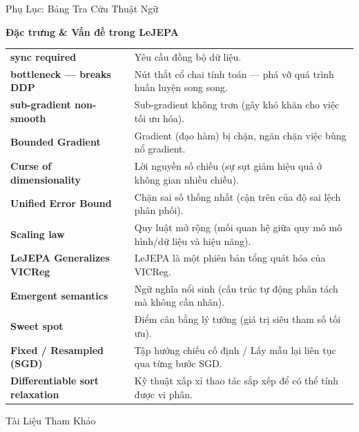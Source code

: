 \documentclass[aspectratio=169,9pt]{beamer}
\begin{document}
\begin{frame}[allowframebreaks]{Phụ Lục: Bảng Tra Cứu Thuật Ngữ}
  \begin{accentbox}
  \footnotesize \textbf{Đặc trưng \& Vấn đề trong LeJEPA}
  \end{accentbox}
  \vspace{0.5em}
  {\scriptsize
  \renewcommand{\arraystretch}{1.4}
  \begin{tabular}{@{} >{\bfseries\color{maccent!75!black}}l p{10.5cm} @{}}
    sync required & Yêu cầu đồng bộ dữ liệu. \\
    bottleneck — breaks DDP & Nút thắt cổ chai tính toán — phá vỡ quá trình huấn luyện song song. \\
    sub-gradient non-smooth & Sub-gradient không trơn (gây khó khăn cho việc tối ưu hóa). \\
    Bounded Gradient & Gradient (đạo hàm) bị chặn, ngăn chặn việc bùng nổ gradient. \\
    Curse of dimensionality & Lời nguyền số chiều (sự sụt giảm hiệu quả ở không gian nhiều chiều). \\
    Unified Error Bound & Chặn sai số thống nhất (cận trên của độ sai lệch phân phối). \\
    Scaling law & Quy luật mở rộng (mối quan hệ giữa quy mô mô hình/dữ liệu và hiệu năng). \\
    LeJEPA Generalizes VICReg & LeJEPA là một phiên bản tổng quát hóa của VICReg. \\
    Emergent semantics & Ngữ nghĩa nổi sinh (cấu trúc tự động phân tách mà không cần nhãn). \\
    Sweet spot & Điểm cân bằng lý tưởng (giá trị siêu tham số tối ưu). \\
    Fixed / Resampled (SGD) & Tập hướng chiếu cố định / Lấy mẫu lại liên tục qua từng bước SGD. \\
    Differentiable sort relaxation & Kỹ thuật xấp xỉ thao tác sắp xếp để có thể tính được vi phân. \\
  \end{tabular}
  }
\end{frame}

\begin{frame}[allowframebreaks]{Tài Liệu Tham Khảo}
\nocite{*}


\end{frame}
\end{document}
